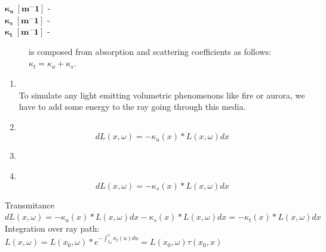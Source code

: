 \begin{description}
\item[$\boldsymbol{\kappa_{a}\; [m^-1]}$ - ] 

\item[$\boldsymbol{\kappa_{s}\; [m^-1]}$ - ] 

\item[$\boldsymbol{\kappa_{t}\; [m^-1]}$ - ]

is composed from absorption and scattering coefficients as follows: $\kappa_{t}=\kappa_{a}+\kappa_{s}$.

\end{description}
 \begin{enumerate}
\item {}\\
To simulate any light emitting volumetric phenomenons like fire or aurora, we have to add some energy to the ray going through this media.
\item {}\\

\begin{equation}
 	dL(x,\omega)=-\kappa_a(x)*L(x,\omega)dx
 \end{equation}
 
 
\item {}\\


\item {}\\
\begin{equation}
	dL(x,\omega)=-\kappa_s(x)*L(x,\omega)dx 
\end{equation}
\end{enumerate}
Transmitance
$dL(x,\omega)=-\kappa_a(x)*L(x,\omega)dx-\kappa_s(x)*L(x,\omega)dx =-\kappa_t(x)*L(x,\omega)dx$
Integration over ray path:
$L(x,\omega)=L(x_0,\omega)*e^{-\int_{x_{0}}^{x}\kappa_t(u)du}=L(x_0,\omega)\tau(x_0,x)$



